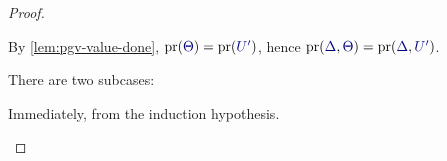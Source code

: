 \begin{proof}
\begin{case*}
\begin{subcase*}[$\tm{x}\in\tm{M}$]
\begin{mathpar}
      \end{mathpar}
    \end{subcase*}
    \begin{subcase*}[$\tm{x}\in\tm{N}$]
      By \cref{lem:pgv-value-done}, $\pr(\ty{\Theta})=\pr(\ty{U'})$, hence $\pr(\ty{\Delta},\ty{\Theta})=\pr(\ty{\Delta},\ty{U'})$.
      \begin{mathpar}
      \end{mathpar}
    \end{subcase*}
  \end{case*}
  \begin{case*}
    There are two subcases:
    \begin{subcase*}[$\tm{x}\in\tm{M}$]
      Immediately, from the induction hypothesis.
      \begin{mathpar}
      \end{mathpar}

\end{subcase*}
\end{case*}
\end{proof}
